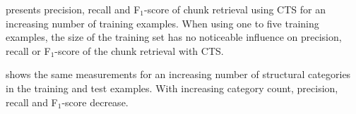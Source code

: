  presents precision,
recall and F$_{1}$-score of chunk retrieval using CTS for an
increasing number of training examples.
When using one to five
training examples, the size of the training set has no noticeable
influence on precision, recall or F$_{1}$-score of the chunk retrieval
with CTS.

 shows the same
measurements for an increasing number of structural categories in the
training and test examples.
With increasing category count, precision,
recall and F$_{1}$-score decrease.


